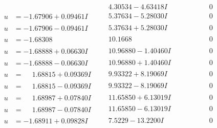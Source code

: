 \documentclass[1p]{elsarticle_modified}
\theoremstyle{definition}
\begin{document}
$$\begin{array}{c|c|c}
 & \phantom{-}4.30534 - 4.63418 I & \phantom{-0.000000 } 0 \\ \hline\begin{aligned}
u &= -1.67906 + 0.09461 I\end{aligned}
 & \phantom{-}5.37634 - 5.28030 I & \phantom{-0.000000 } 0 \\ \hline\begin{aligned}
u &= -1.67906 - 0.09461 I\end{aligned}
 & \phantom{-}5.37634 + 5.28030 I & \phantom{-0.000000 } 0 \\ \hline\begin{aligned}
u &= -1.68308\phantom{ +0.000000I}\end{aligned}
 & \phantom{-}10.1668\phantom{ +0.000000I} & \phantom{-0.000000 } 0 \\ \hline\begin{aligned}
u &= -1.68888 + 0.06630 I\end{aligned}
 & \phantom{-}10.96880 - 1.40460 I & \phantom{-0.000000 } 0 \\ \hline\begin{aligned}
u &= -1.68888 - 0.06630 I\end{aligned}
 & \phantom{-}10.96880 + 1.40460 I & \phantom{-0.000000 } 0 \\ \hline\begin{aligned}
u &= \phantom{-}1.68815 + 0.09369 I\end{aligned}
 & \phantom{-}9.93322 + 8.19069 I & \phantom{-0.000000 } 0 \\ \hline\begin{aligned}
u &= \phantom{-}1.68815 - 0.09369 I\end{aligned}
 & \phantom{-}9.93322 - 8.19069 I & \phantom{-0.000000 } 0 \\ \hline\begin{aligned}
u &= \phantom{-}1.68987 + 0.07840 I\end{aligned}
 & \phantom{-}11.65850 + 6.13019 I & \phantom{-0.000000 } 0 \\ \hline\begin{aligned}
u &= \phantom{-}1.68987 - 0.07840 I\end{aligned}
 & \phantom{-}11.65850 - 6.13019 I & \phantom{-0.000000 } 0 \\ \hline\begin{aligned}
u &= -1.68911 + 0.09828 I\end{aligned}
 & \phantom{-}7.5229 - 13.2200 I & \phantom{-0.000000 } 0 \\ \hline\begin{aligned}

\end{aligned}
\end{array}$$
\end{document}
